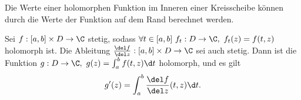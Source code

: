 		\begin{rem*}
			Die Werte einer holomorphen Funktion im Inneren einer Kreisscheibe können durch die Werte der Funktion auf dem Rand berechnet werden.
		\end{rem*}
		
		\begin{rem*}
			Sei $ f: [a,b]\times D \to \C $ stetig, sodass $ \forall t \in [a,b]\ f_t: D \to \C,\ f_t(z) = f(t,z) $ holomorph ist. Die Ableitung $ \frac{\del f}{\del z}: [a,b]\times D \to \C $ sei auch stetig. Dann ist die Funktion $ g: D \to \C,\ g(z) = \int_a^b f(t,z) \d t $ holomorph, und es gilt
			\[ g'(z) = \int_a^b \frac{\del f}{\del z}(t,z)\d t. \]
		\end{rem*}